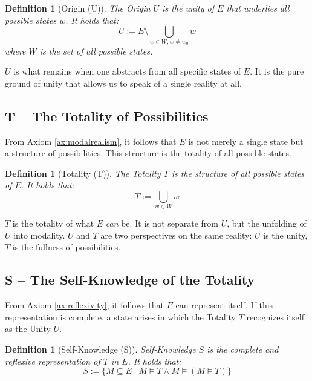 \documentclass[12pt,a4paper]{article}
\newtheorem{definition}[theorem]{Definition}
\begin{document}
\begin{definition}[Origin (U)]
\label{def:origin}
The Origin \(U\) is the unity of \(E\) that underlies all possible states \(w\). It holds that:
\begin{equation}
U := E \setminus \bigcup_{w \in W, w \neq w_0} w
\end{equation}
where \(W\) is the set of all possible states.
\end{definition}

\(U\) is what remains when one abstracts from all specific states of \(E\). It is the pure ground of unity that allows us to speak of a single reality at all.

\subsection{T – The Totality of Possibilities}

From Axiom \ref{ax:modalrealism}, it follows that \(E\) is not merely a single state but a structure of possibilities. This structure is the totality of all possible states.

\begin{definition}[Totality (T)]
\label{def:totality}
The Totality \(T\) is the structure of all possible states of \(E\). It holds that:
\begin{equation}
T := \bigcup_{w \in W} w
\end{equation}
\end{definition}

\(T\) is the totality of what \(E\) \emph{can} be. It is not separate from \(U\), but the unfolding of \(U\) into modality. \(U\) and \(T\) are two perspectives on the same reality: \(U\) is the unity, \(T\) is the fullness of possibilities.

\subsection{S – The Self-Knowledge of the Totality}

From Axiom \ref{ax:reflexivity}, it follows that \(E\) can represent itself. If this representation is complete, a state arises in which the Totality \(T\) recognizes itself as the Unity \(U\).

\begin{definition}[Self-Knowledge (S)]
\label{def:selfknowledge}
Self-Knowledge \(S\) is the complete and reflexive representation of \(T\) in \(E\). It holds that:
\begin{equation}
S := \{M \subseteq E \mid M \models T \land M \models (M \models T)\}
\end{equation}
\end{definition}
\end{document}

